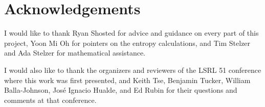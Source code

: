 \documentclass[12pt,twoside]{article}
\begin{document}
\section*{Acknowledgements}

I would like to thank Ryan Shosted for advice and guidance on every part of this project, Yoon Mi Oh for pointers on the entropy calculations, and Tim Stelzer and Ada Stelzer for mathematical assistance.

I would also like to thank the organizers and reviewers of the LSRL 51 conference where this work was first presented, and Keith Tse, Benjamin Tucker, William Balla-Johnson, José Ignacio Hualde, and Ed Rubin for their questions and comments at that conference.

\label{sec:refs}
\printbibliography
\end{document}

